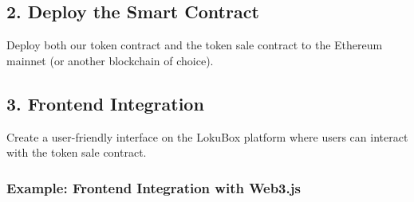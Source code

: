 \documentclass{tufte-handout}
\begin{document}
\subsection*{2. Deploy the Smart Contract}

Deploy both our token contract and the token sale contract to the Ethereum mainnet (or another blockchain of choice).

\subsection*{3. Frontend Integration}

Create a user-friendly interface on the LokuBox platform where users can interact with the token sale contract.

\subsubsection*{Example: Frontend Integration with Web3.js}
\end{document}
